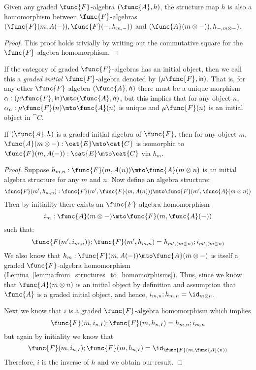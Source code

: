 \begin{lemma}
    \label{lemma:from_structures_to_homomorphisms}
    Given any graded $\func{F}$-algebra $(\func{A},h)$, the structure map
    $h$ is also a homomorphism between $\func{F}$-algebras
    $(\func{F}(m,A(-)),\func{F}(-,h_{m,-}))$ and 
    $(\func{A}(m \otimes -)),h_{-, m \otimes -})$.
\end{lemma}
\begin{proof}
    This proof holds trivially by writing out the commutative square for
    the $\func{F}$-algebra homomorphism.
\end{proof}

\begin{definition}
    If the category of graded $\func{F}$-algebras has an initial
    object, then we call this a \emph{graded initial}
    $\func{F}$-algebra denoted by $(\mu\func{F}, \mathsf{in})$.  That
    is, for any other $\func{F}$-algebra $(\func{A},h)$ there must be
    a unique morphism $\alpha : (\mu\func{F}, \mathsf{in}) \mto
    (\func{A},h)$, but this implies that for any object $n$, $\alpha_n
    : \mu\func{F}(n) \mto \func{A}(n)$ is unique and $\mu\func{F}(n)$
    is an initial object in $\cat{C}$.
\end{definition}

\begin{lemma}
    \label{lemma:graded_lambeks_lemma}
    If $(\func{A},h)$ is a graded initial algebra of $\func{F}$, 
    then for any object $m$, 
    $\func{A}(m \otimes -) : \cat{E} \mto \cat{C}$ is isomorphic to 
    $\func{F}(m, A(-)) : \cat{E} \mto \cat{C}$ via $h_m$.
\end{lemma}
\begin{proof}
    Suppose $h_{m,n} : \func{F}(m,A(n)) \mto \func{A}(m \otimes n)$ is an initial
    algebra structure for any $m$ and $n$.  
    Now define an algebra structure:
    \[
    \func{F}(m',h_{m,n}) : \func{F}(m',\func{F}(m,A(n))) \mto \func{F}(m',\func{A}(m \otimes n))
    \]
    Then by initiality there exists an $\func{F}$-algebra homomorphism 
    $$i_{m} : \func{A}(m \otimes -) \mto \func{F}(m,\func{A}(-))$$ such that:
    $$\func{F(m',i_{m,n})} ; \func{F}(m',h_{m,n}) = h_{m',(m \otimes n)} ;
    i_{m',(m \otimes n)}$$
    We also know that $h_{m} : \func{F}(m,A(-)) \mto \func{A}(m \otimes -)$ is
    itself a graded $\func{F}$-algebra homomorphism
    (Lemma~\ref{lemma:from_structures_to_homomorphisms}). Thus, since we
    know that $\func{A}(m \otimes n)$ is an initial object by definition and
    assumption that $\func{A}$ is a graded initial object, and hence, 
    $i_{m,n}; h_{m,n} = \id_{m \otimes n}$.  
    
    Next we know that $i$ is a graded $\func{F}$-algebra homomorphism which
    implies $$\func{F}(m,i_{n,I});\func{F}(m,h_{n,I}) =
    h_{m,n};i_{m,n}$$ but again by initiality we know that
    $$\func{F}(m,i_{n,I});\func{F}(m,h_{n,I}) =
    \id_{\func{F}(m,\func{A}(n))}$$
    Therefore, $i$ is the inverse of $h$ and we obtain our result.
\end{proof}

